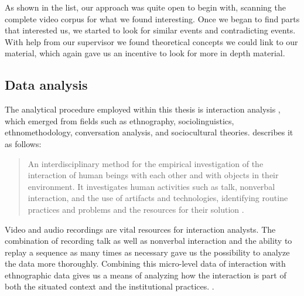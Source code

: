 As shown in the list, our approach was quite open to begin with, scanning the complete video corpus for what we found interesting. Once we began to find parts that interested us, we started to look for similar events and contradicting events. With help from our supervisor we found theoretical concepts we could link to our material, which again gave us an incentive to look for more in depth material.

\subsection{Data analysis}
The analytical procedure employed within this thesis is interaction analysis \citep{jordan1995interaction}, which emerged from fields such as ethnography, sociolinguistics, ethnomethodology, conversation analysis, and sociocultural theories. \citeauthor{jordan1995interaction} describes it as follows:

\begin{quote}
An interdisciplinary method for the empirical investigation of the interaction of human
beings with each other and with objects in their environment. It investigates human
activities such as talk, nonverbal interaction, and the use of artifacts and technologies,
identifying routine practices and problems and the resources for their solution \citep[p. 39]{jordan1995interaction}.
\end{quote}

Video and audio recordings are vital resources for interaction analysts. The combination of recording talk as well as nonverbal interaction and the ability to replay a sequence as many times as necessary gave us the possibility to analyze the data more thoroughly. Combining this micro-level data of interaction with ethnographic data gives us a means of analyzing how the interaction is part of both the situated context and the institutional practices. \citep{furberg2009scientific}. 



